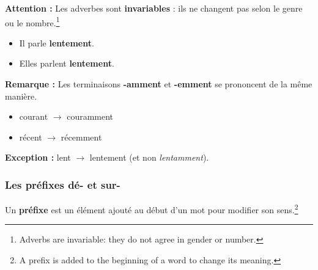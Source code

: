 \documentclass[math,code]{amznotes}
\theoremstyle{remark}
\begin{document}
\begin{notebox}
\textbf{Attention :} Les adverbes sont \textbf{invariables} : ils ne changent pas selon le genre ou le nombre.\footnote{Adverbs are invariable: they do not agree in gender or number.}

\begin{itemize}
    \item Il parle \textbf{lentement}.
    \item Elles parlent \textbf{lentement}.
\end{itemize}

\textbf{Remarque :} Les terminaisons \textbf{-amment} et \textbf{-emment} se prononcent de la même manière.

\begin{itemize}
    \item courant $\rightarrow$ couramment
    \item récent $\rightarrow$ récemment
\end{itemize}

\textbf{Exception :} lent $\rightarrow$ lentement (et non \textit{len\-tamment}).
\end{notebox}

\subsubsection*{Les préfixes dé- et sur-}

Un \textbf{préfixe} est un élément ajouté au début d'un mot pour modifier son sens.\footnote{A prefix is added to the beginning of a word to change its meaning.}
\end{document}

